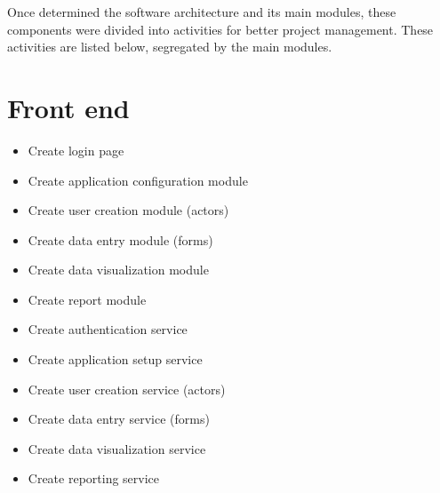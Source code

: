 
Once determined the software architecture and its main modules, these components were divided into activities for better project management. These activities are listed below, segregated by the main modules.

\section{Front end}\label{sec:FrontendActivities}
\begin{itemize}
\item Create login page
\item Create application configuration module
\item Create user creation module (actors)
\item Create data entry module (forms)
\item Create data visualization module
\item Create report module
\item Create authentication service
\item Create application setup service
\item Create user creation service (actors)
\item Create data entry service (forms)
\item Create data visualization service
\item Create reporting service
\end{itemize}

